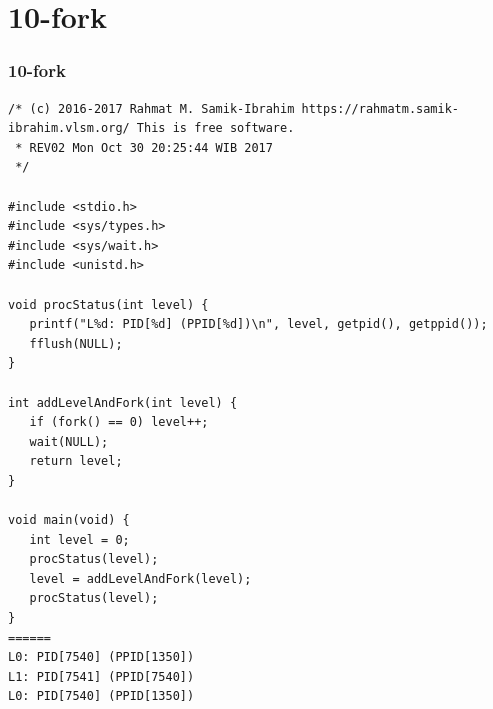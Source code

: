 \documentclass[aspectratio=169, xcolor=table, notheorems, hyperref={pdfpagelabels=false}]{beamer}
\begin{document}
\section{10-fork}
\begin{frame}[fragile]
\frametitle{10-fork}
\begin{lstlisting}[basicstyle=\ttfamily\tiny]
/* (c) 2016-2017 Rahmat M. Samik-Ibrahim https://rahmatm.samik-ibrahim.vlsm.org/ This is free software.
 * REV02 Mon Oct 30 20:25:44 WIB 2017
 */

#include <stdio.h>
#include <sys/types.h>
#include <sys/wait.h>
#include <unistd.h>

void procStatus(int level) {
   printf("L%d: PID[%d] (PPID[%d])\n", level, getpid(), getppid());
   fflush(NULL);
}

int addLevelAndFork(int level) {
   if (fork() == 0) level++;
   wait(NULL);
   return level;
}

void main(void) {
   int level = 0;
   procStatus(level);
   level = addLevelAndFork(level);
   procStatus(level);
}
======
L0: PID[7540] (PPID[1350])
L1: PID[7541] (PPID[7540])
L0: PID[7540] (PPID[1350])

\end{lstlisting}
\end{frame}

\end{document}

